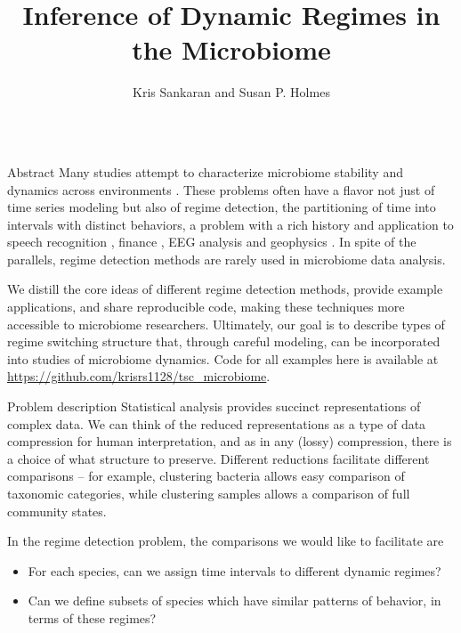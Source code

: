 \documentclass[final, 8pt]{beamer}
\title{Inference of Dynamic Regimes in the Microbiome}
\author{Kris Sankaran and Susan P. Holmes}
\institute{Department of Statistics, Stanford University}
\newlength{\onecolwid}
\begin{document}
\begin{frame}

\begin{columns}
\begin{column}{\onecolwid}

\begin{block}{Abstract}
Many studies attempt to characterize microbiome stability and dynamics across
environments \citep{costello2012application, stein2013ecological,
  faust2015metagenomics}. These problems often have a flavor not just of time
series modeling but also of regime detection, the partitioning of time into
intervals with distinct behaviors, a problem with a rich history and application
to speech recognition \citep{fox2011sticky}, finance \citep{lee2009optimal}, EEG
analysis \citep{camilleri2014automatic} and geophysics
\citep{weatherley2002relationship}. In spite of the parallels, regime detection
methods are rarely used in microbiome data analysis.

We distill the core ideas of different regime detection methods, provide example
applications, and share reproducible code, making these techniques more
accessible to microbiome researchers. Ultimately, our goal is to describe types
of regime switching structure that, through careful modeling, can be
incorporated into studies of microbiome dynamics. Code for all examples here is
available at \url{https://github.com/krisrs1128/tsc\_microbiome}.
\end{block}

\begin{block}{Problem description}
Statistical analysis provides succinct representations of complex data. We can
think of the reduced representations as a type of data compression for human
interpretation, and as in any (lossy) compression, there is a choice of what
structure to preserve. Different reductions facilitate different comparisons --
for example, clustering bacteria allows easy comparison of taxonomic categories,
while clustering samples allows a comparison of full community states.

In the regime detection problem, the comparisons we would like to facilitate are
\begin{itemize}
\item For each species, can we assign time intervals to different dynamic
  regimes?
\item Can we define subsets of species which have similar patterns of behavior,
  in terms of these regimes?
\end{itemize}


\end{block}
\end{column}
\end{columns}
\end{frame}
\end{document}
